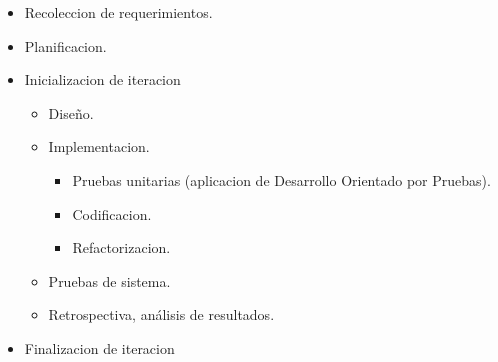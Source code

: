 \begin{itemize}
	\itemsep1pt \parskip1pt 
	\item Recoleccion de requerimientos.
	\item Planificacion.
	\item Inicializacion de iteracion
	\begin{itemize}
		\item Diseño.
		\item Implementacion.
		\begin{itemize}
			\item Pruebas unitarias (aplicacion de Desarrollo Orientado por Pruebas).
			\item Codificacion.
			\item Refactorizacion.
		\end{itemize}
		\item Pruebas de sistema.
		\item Retrospectiva, análisis de resultados.
	\end{itemize}
	\item Finalizacion de iteracion
\end{itemize}